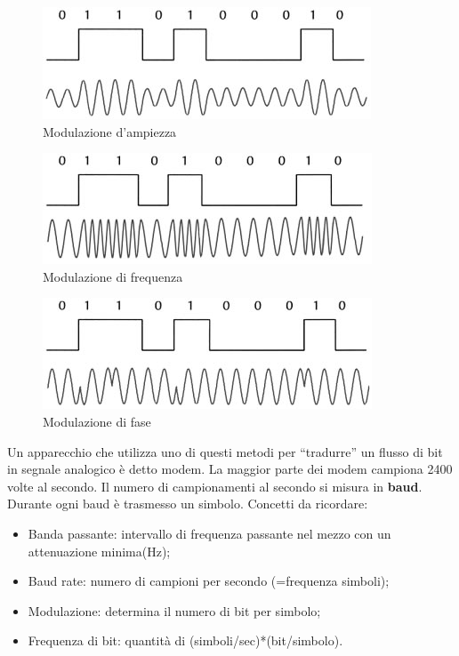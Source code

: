 \begin{figure}[htbp]
\centering
\includegraphics[scale=1]{images/modulazione_ask.jpg}
\caption{Modulazione d'ampiezza}
\end{figure}

\begin{figure}[htbp]
\centering
\includegraphics[scale=1]{images/modulazione_fsk.jpg}
\caption{Modulazione di frequenza}
\end{figure}

\begin{figure}[htbp]
\centering
\includegraphics[scale=1]{images/modulazione_psk.jpg}
\caption{Modulazione di fase}
\end{figure}

Un apparecchio che utilizza uno di questi metodi per ``tradurre'' un flusso di bit in segnale analogico è detto modem. La maggior parte dei modem campiona 2400 volte al secondo. Il numero di campionamenti al secondo si misura in \textbf{baud}. Durante ogni baud è trasmesso un simbolo.
Concetti da ricordare:

\begin{itemize}
\item{Banda passante: intervallo di frequenza passante nel mezzo con un attenuazione minima(Hz)};
\item{Baud rate: numero di campioni per secondo (=frequenza simboli)};
\item{Modulazione: determina il numero di bit per simbolo};
\item{Frequenza di bit: quantità di (simboli/sec)*(bit/simbolo)}.

\end{itemize}

